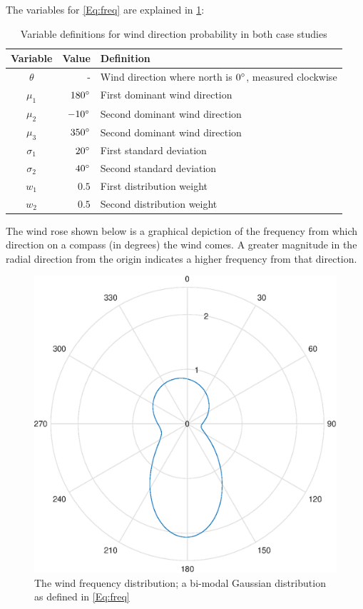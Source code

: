 \documentclass[12pt]{article}
\begin{document}
    The variables for \cref{Eq:freq} are explained in \cref{tab:WindDirProb}:
        \begin{table}[H]
        \centering
        \begin{tabular}{|c|r|l|}
            \hline
             Variable & Value & Definition \\ \hline
            $\theta$ & - & Wind direction where north is $0 \degree$, measured clockwise \\ \hline
            $\mu_1$ & $180\degree$ & First dominant wind direction \\ \hline
            $\mu_2$ & $-10\degree$ & Second dominant wind direction \\ \hline
            $\mu_3$ & $350\degree$ & Second dominant wind direction \\ \hline
            $\sigma_1$ & $20 \degree$ & First standard deviation \\ \hline
            $\sigma_2$ & $40 \degree$ & Second standard deviation \\ \hline
            $w_1$ & $0.5$ & First distribution weight \\ \hline
            $w_2$ & $0.5$ & Second distribution weight \\ \hline
        \end{tabular}
        \caption{Variable definitions for wind direction probability in both case studies}
        \label{tab:WindDirProb}
        \end{table}
    
    The wind rose shown below is a graphical depiction of the frequency from which direction on a compass (in degrees) the wind comes. A greater magnitude in the radial direction from the origin indicates a higher frequency from that direction.
        \begin{figure}[H]
            \centering
            \includegraphics{WindRose.eps}
            \caption{The wind frequency distribution; a bi-modal Gaussian distribution as defined in \cref{Eq:freq}}
            \label{Fig:freq}
        \end{figure}
\end{document}
